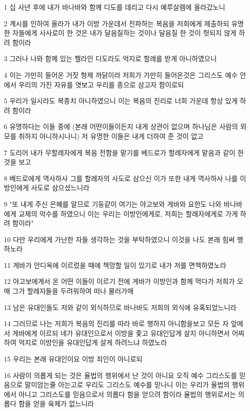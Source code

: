 \par 1 십 사년 후에 내가 바나바와 함께 디도를 데리고 다시 예루살렘에 올라갔노니
\par 2 계시를 인하여 올라가 내가 이방 가운데서 전파하는 복음을 저희에게 제출하되 유명한 자들에게 사사로이 한 것은 내가 달음질하는 것이나 달음질 한 것이 헛되지 않게 하려 함이라
\par 3 그러나 나와 함께 있는 헬라인 디도라도 억지로 할례를 받게 아니하였으니
\par 4 이는 가만히 들어온 거짓 형제 까닭이라 저희가 가만히 들어온것은 그리스도 예수 안에서 우리의 가진 자유를 엿보고 우리를 종으로 삼고자 함이로되
\par 5 우리가 일시라도 복종치 아니하였으니 이는 복음의 진리로 너희 가운데 항상 있게 하려 함이라
\par 6 유명하다는 이들 중에 (본래 어떤이들이든지 내게 상관이 없으며 하나님은 사람의 외모를 취하지 아니하시나니) 저 유명한 이들은 내게 더하여 준 것이 없고
\par 7 도리어 내가 무할례자에게 복음 전함을 맡기를 베드로가 할례자에게 맡음과 같이 한 것을 보고
\par 8 베드로에게 역사하사 그를 할례자의 사도로 삼으신 이가 또한 내게 역사하사 나를 이방인에게 사도로 삼으셨느니라
\par 9 "또 내게 주신 은혜를 알므로 기둥같이 여기는 야고보와 게바와 요한도 나와 바나바에게 교제의 악수를 하였으니 이는 우리는 이방인에게로, 저희는 할례자에게로 가게 하려 함이라"
\par 10 다만 우리에게 가난한 자들 생각하는 것을 부탁하였으니 이것을 나도 본래 힘써 행하노라
\par 11 게바가 안디옥에 이르렀을 때에 책망할 일이 있기로 내가 저를 면책하였노라
\par 12 야고보에게서 온 어떤 이들이 이르기 전에 게바가 이방인과 함께 먹다가 저희가 오매 그가 할례자들을 두려워하여 떠나 물러가매
\par 13 남은 유대인들도 저와 같이 외식하므로 바나바도 저희의 외식에 유혹되었느니라
\par 14 그러므로 나는 저희가 복음의 진리를 따라 바로 행하지 아니함을보고 모든 자 앞에서 게바에게 이르되 네가 유대인으로서 이방을 좇고 유대인답게 살지 아니하면서 어찌하여 억지로 이방인을 유대인답게 살게 하려느냐 하였노라
\par 15 우리는 본래 유대인이요 이방 죄인이 아니로되
\par 16 사람이 의롭게 되는 것은 율법의 행위에서 난 것이 아니요 오직 예수 그리스도를 믿음으로 말미암는줄 아는고로 우리도 그리스도 예수를 믿나니 이는 우리가 율법의 행위에서 아니고 그리스도를 믿음으로서 의롭다 함을 얻으려 함이라 율법의 행위로서는 의롭다 함을 얻을 육체가 없느니라

